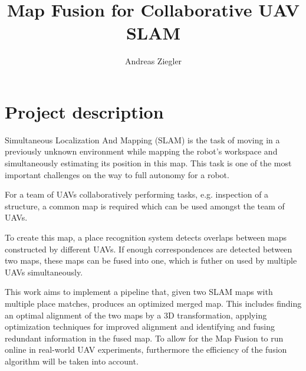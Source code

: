 \documentclass[10pt,a4paper]{article}
\author{Andreas Ziegler}
\title{Map Fusion for Collaborative UAV SLAM}
\begin{document}
\maketitle

\section{Project description}
Simultaneous Localization And Mapping (SLAM) is the task of moving in a previously unknown environment while mapping the robot’s workspace and simultaneously estimating its position in this map. This task is one of the most important challenges on the way to full autonomy for a robot.

For a team of UAVs collaboratively performing tasks, e.g. inspection of a structure, a common map is required which can be used amongst the team of UAVs.

To create this map, a place recognition system detects overlaps between maps constructed by different UAVs. If enough correspondences are detected between two maps, these maps can be fused into one, which is futher on used by multiple UAVs simultaneously.

This work aims to implement a pipeline that, given two SLAM maps with multiple place matches, produces an optimized merged map. This includes finding an optimal alignment of the two maps by a 3D transformation, applying optimization techniques for improved alignment and identifying and fusing redundant information in the fused map. To allow for the Map Fusion to run online in real-world UAV experiments, furthermore the efficiency of the fusion algorithm will be taken into account.
\end{document}
